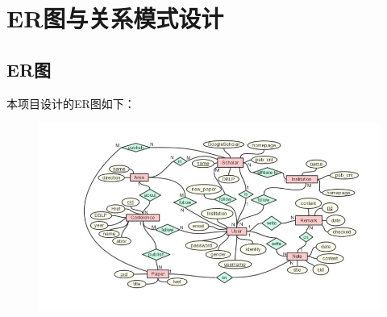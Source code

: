 
\section{ER图与关系模式设计}

\subsection{ER图}

本项目设计的ER图如下：

\begin{figure}[h]
\includegraphics[width=\linewidth]{asset/ER.jpg}
\end{figure}


